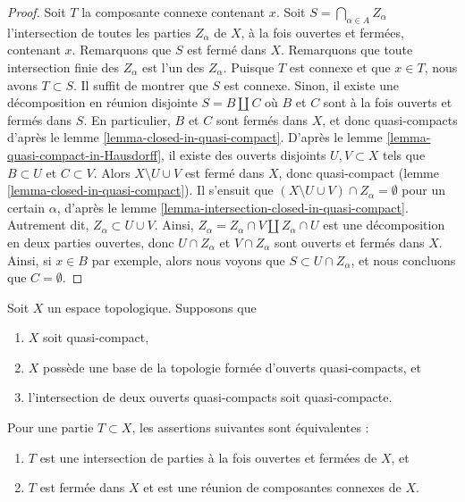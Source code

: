 \begin{proof}
Soit $T$ la composante connexe contenant $x$.
Soit $S = \bigcap_{\alpha \in A} Z_\alpha$ l'intersection de toutes les
parties $Z_\alpha$ de $X$, à la fois ouvertes et fermées, contenant $x$.
Remarquons que $S$ est fermé dans $X$.
Remarquons que toute intersection finie des $Z_\alpha$ est l'un des $Z_\alpha$.
Puisque $T$ est connexe et que $x \in T$, nous avons $T \subset S$.
Il suffit de montrer que $S$ est connexe.
Sinon, il existe une décomposition en réunion disjointe
$S = B \amalg C$ où $B$ et $C$ sont à la fois ouverts et fermés dans $S$.
En particulier, $B$ et $C$ sont fermés dans $X$, et donc quasi-compacts d'après le
lemme \ref{lemma-closed-in-quasi-compact}.
D'après le lemme \ref{lemma-quasi-compact-in-Hausdorff},
il existe des ouverts disjoints $U, V \subset X$ tels que $B \subset U$ et
$C \subset V$. Alors $X \setminus U \cup V$ est fermé dans $X$,
donc quasi-compact (lemme \ref{lemma-closed-in-quasi-compact}).
Il s'ensuit que $(X \setminus U \cup V) \cap Z_\alpha = \emptyset$
pour un certain $\alpha$, d'après le lemme \ref{lemma-intersection-closed-in-quasi-compact}.
Autrement dit, $Z_\alpha \subset U \cup V$. Ainsi,
$Z_\alpha = Z_\alpha \cap V \amalg Z_\alpha \cap U$
est une décomposition en deux parties ouvertes,
donc $U \cap Z_\alpha$ et $V \cap Z_\alpha$ sont ouverts et fermés dans $X$.
Ainsi, si $x \in B$ par exemple, alors nous voyons que $S \subset U \cap Z_\alpha$,
et nous concluons que $C = \emptyset$.
\end{proof}

\begin{lemma}
\label{lemma-closed-union-connected-components}
Soit $X$ un espace topologique.
Supposons que
\begin{enumerate}
\item $X$ soit quasi-compact,
\item $X$ possède une base de la topologie formée d'ouverts quasi-compacts, et
\item l'intersection de deux ouverts quasi-compacts soit quasi-compacte.
\end{enumerate}
Pour une partie $T \subset X$, les assertions suivantes sont équivalentes :
\begin{enumerate}
\item[(a)] $T$ est une intersection de parties à la fois ouvertes et fermées de $X$, et
\item[(b)] $T$ est fermée dans $X$ et est une réunion de composantes connexes de $X$.
\end{enumerate}
\end{lemma}

